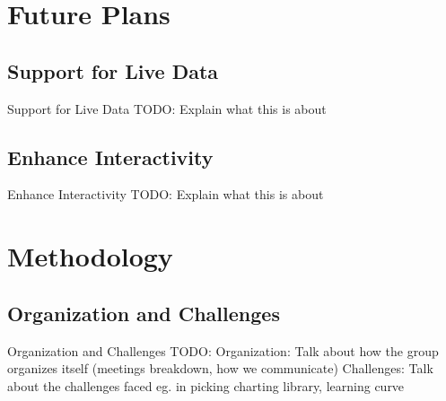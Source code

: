 \documentclass{beamer}
\begin{document}
\section{Future Plans}

\subsection{Support for Live Data}
\begin{frame}{Support for Live Data}
TODO: Explain what this is about
\end{frame}

\subsection{Enhance Interactivity}
\begin{frame}{Enhance Interactivity}
TODO: Explain what this is about
\end{frame}

\section{Methodology}

\subsection{Organization and Challenges}
\begin{frame}{Organization and Challenges}
TODO: 
Organization: Talk about how the group organizes itself (meetings breakdown, how we communicate)
\newline Challenges: Talk about the challenges faced eg. in picking charting library, learning curve 
\end{frame}
\end{document}
